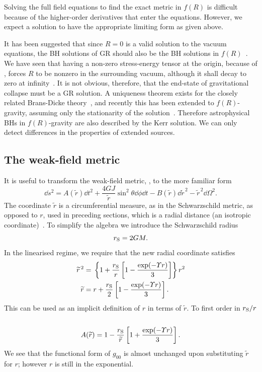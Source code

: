 Solving the full field equations to find the exact metric in $f(R)$ is difficult because of the higher-order derivatives that enter the equations. However, we expect a solution to have the appropriate limiting form as given above.

It has been suggested that since $R = 0$ is a valid solution to the vacuum equations, the BH solutions of GR should also be the BH solutions in $f(R)$~\cite{Psaltis2008, Barausse2008}. We have seen that having a non-zero stress-energy tensor at the origin, because of , forces $R$ to be nonzero in the surrounding vacuum, although it shall decay to zero at infinity~\cite{Olmo2007c}. It is not obvious, therefore, that the end-state of gravitational collapse must be a GR solution. A uniqueness theorem exists for the closely related Brans-Dicke theory~\cite{Hawking1972a, Bekenstein1978, Thorne1971, Scheel1995}, and recently this has been extended to $f(R)$-gravity, assuming only the stationarity of the solution~\cite{Sotiriou2011}. Therefore astrophysical BHs in $f(R)$-gravity are also described by the Kerr solution. We can only detect differences in the properties of extended sources.

\subsection{The weak-field metric}

It is useful to transform the weak-field metric, , to the more familiar form
\begin{equation}
\dd s^2 = A(\widetilde{r}) \dd t^2 + \frac{4GJ}{\widetilde{r}} \sin^2\theta \dd \phi \dd t - B(\widetilde{r})\dd \widetilde{r}^{\,2} - \widetilde{r}^{\,2} \dd \Omega^2.
\label{eq:Sph_sym}
\end{equation}
The coordinate $\widetilde{r}$ is a circumferential measure, as in the Schwarzschild metric, as opposed to $r$, used in preceding sections, which is a radial distance (an isotropic coordinate)~\cite{Misner1973, Olmo2007c}. To simplify the algebra we introduce the Schwarzschild radius
\begin{equation}
r_\mathrm{S} = 2GM.
\end{equation}
In the linearised regime, we require that the new radial coordinate satisfies
\begin{align}
\widetilde{r}^{\,2} = {} & \left\{1 + \frac{r_\mathrm{S}}{r}\left[1 - \frac{\exp(-\Upsilon r)}{3}\right]\right\}r^2 \\
\widetilde{r} = {} & r + \frac{r_\mathrm{S}}{2}\left[1 - \frac{\exp(-\Upsilon r)}{3}\right].
\label{eq:r_tilde}
\end{align}
This can be used as an implicit definition of $r$ in terms of $\widetilde{r}$. To first order in ${r_\mathrm{S}}/{r}$~\cite{Olmo2007c}
\begin{equation}
A(\widetilde{r}) = 1 - \frac{r_\mathrm{S}}{\widetilde{r}}\left[1 + \frac{\exp(-\Upsilon r )}{3}\right].
\label{eq:A_metric}
\end{equation}
We see that the functional form of $g_{00}$ is almost unchanged upon substituting $\widetilde{r}$ for $r$; however $r$ is still in the exponential.

